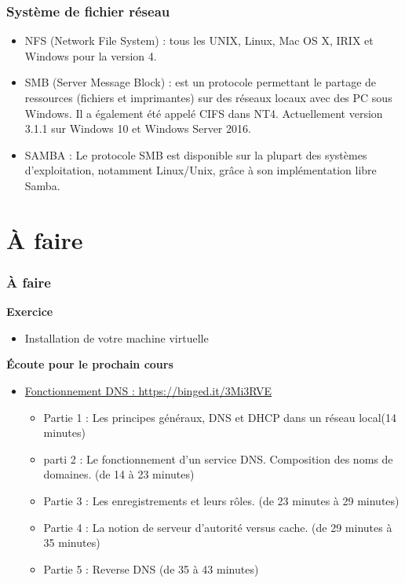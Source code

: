 	\begin{frame}[containsverbatim]
		\frametitle{Système de fichier réseau}
		\begin{itemize}
			\item  NFS (Network File System) : tous les UNIX, Linux, Mac OS X, IRIX et Windows pour la version 4.
			\item SMB (Server Message Block) : est un protocole permettant le partage de ressources (fichiers et imprimantes) sur des réseaux locaux avec des PC sous Windows. Il a également été appelé CIFS dans NT4. 
			Actuellement version 3.1.1 sur Windows 10 et Windows Server 2016.
			\item SAMBA : Le protocole SMB est disponible sur la plupart des systèmes d'exploitation, notamment Linux/Unix, grâce à son implémentation libre Samba.
			
		\end{itemize}
		
	\end{frame}
	
	
	\section{À faire}
	
	\begin{frame}
		\frametitle{À faire}
		
		
		\textbf{Exercice} 
		\begin{itemize}
			\item Installation de votre machine virtuelle\\
			
		\end{itemize}
		\textbf{Écoute pour le prochain cours} 
		\begin{itemize}
			\item \href{https://binged.it/3Mi3RVE}{Fonctionnement DNS : https://binged.it/3Mi3RVE}
			\begin{itemize}
				\item Partie 1 : Les principes généraux, DNS et DHCP dans un réseau local(14 minutes)
				\item parti 2 : Le fonctionnement d'un service DNS. Composition des noms de domaines. (de 14 à 23 minutes)
				\item Partie 3 : Les enregistrements et leurs rôles. (de 23 minutes à 29 minutes)
				\item Partie 4 : La notion de serveur d'autorité versus cache. (de 29 minutes à 35 minutes)
				\item Partie 5 : Reverse DNS (de 35 à 43 minutes)
			\end{itemize}
			
			
		\end{itemize}
		
		
	\end{frame}
	


